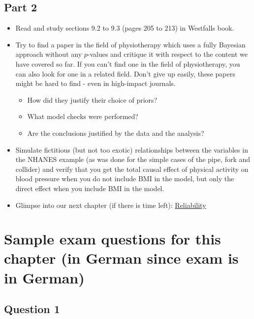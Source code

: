 \documentclass[
]{book}
\providecommand{\tightlist}{%
  \setlength{\itemsep}{0pt}\setlength{\parskip}{0pt}}
\begin{document}
\subsection{Part 2}\label{part-2}

\begin{itemize}
\item
  Read and study sections 9.2 to 9.3 (pages 205 to 213) in Westfalls book.
\item
  Try to find a paper in the field of physiotherapy which uses a fully Bayesian approach without any
  \(p\)-values and critique it with respect to the content we have covered so far.
  If you can't find one in the field of physiotherapy, you can also look for one in a related field.
  Don't give up easily, these papers might be hard to find - even in high-impact journals.

  \begin{itemize}
  \tightlist
  \item
    How did they justify their choice of priors?
  \item
    What model checks were performed?
  \item
    Are the conclusions justified by the data and the analysis?
  \end{itemize}
\item
  Simulate fictitious (but not too exotic) relationships between the variables in the NHANES example (as was done
  for the simple cases of the pipe, fork and collider)
  and verify that you get the total causal effect of physical activity on blood pressure
  when you do not include BMI in the model,
  but only the direct effect when you include BMI in the model.
\item
  Glimpse into our next chapter (if there is time left):
  \href{https://jdegenfellner.github.io/Script_QM3_ZHAW/reliability-and-validity.html}{Reliability}
\end{itemize}

\section{Sample exam questions for this chapter (in German since exam is in German)}\label{sample-exam-questions-for-this-chapter-in-german-since-exam-is-in-german-2}

\subsection{Question 1}\label{question-1-2}
\end{document}

